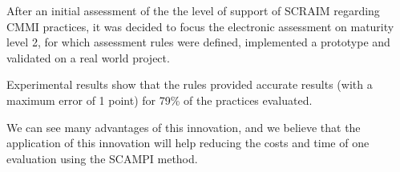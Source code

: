 After an initial assessment of the the level of support of SCRAIM regarding CMMI practices, it was decided to focus the electronic assessment on maturity level 2, for which assessment rules were defined, implemented a prototype and validated on a real world project.

Experimental results show that the rules provided accurate results (with a maximum error of 1 point) for 79\% of the practices evaluated.

We can see many advantages of this innovation, and we believe that the application of this innovation will help reducing the costs and time of one evaluation using the SCAMPI method.